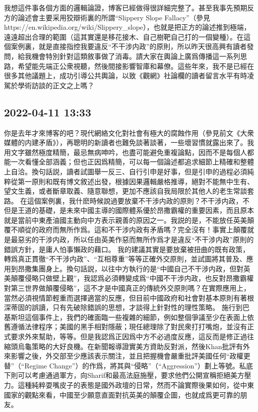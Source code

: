 \documentclass[twocolumn]{ctexart}
\begin{document}
我想這件事各個方面的邏輯論證，博客已經做得很詳細完整了。甚至我事先預期反方的論述會主要采用狡辯術裏的所謂“Slippery Slope Fallacy”（參見https://en.wikipedia.org/wiki/Slippery\_slope），也就是把正方的論述推到極端，遠遠超出合理的範圍（這其實還是移花接木、自己樹靶自己打的一個變種）。在這個案例裏，就是直接指控我要違反“不干涉内政”的原則，所以昨天很高興有讀者發問，給我機會特別針對這類敘事做了消毒。請大家在輿論上廣爲傳播這一系列思路，希望能先端正公衆視聽，然後間接影響智庫和幕僚。這些年來，我不是已經在很多其他議題上，成功引導公共輿論，以致《觀網》社論欄的讀者留言水平有時凌駕於學術訪談的正文之上嗎？
\subsection*{2022-04-11 13:33}

你是去年才來博客的吧？現代網絡文化對社會有極大的腐蝕作用（參見前文《大衆媒體的内建矛盾》），再聰明的新讀者也難免談著談著，一些壞習慣就露出來了。我用文字雖然極度精簡，最忌無病呻吟，也盡可能避免重複論點，因而不是每個人都能一次看懂全部涵義；但也正因爲精簡，可以每一個論述都追求細節上精確和整體上自洽。換句話説，讀者試圖舉一反三、自行引申是好事，但是引申的過程必須純粹從第一原則和既有博文敘述出發，根據因果邏輯嚴格推導，絕對不能無中生有、望文生義，或者斷章取義、隨意聯想，更加不應該自我局限於其他人的老生常談套路。
在這個案例裏，我什麽時候說過要放棄不干涉内政的原則？不干涉内政，不但是王道的基礎，是未來中國主導的國際體系優於昂撒霸權的重要因素，而且原本就是當前中東產油國主動向中方表示親善的原因之一。我説的是，不能放任英美顛覆不順從的政府而無所作爲。這和不干涉内政有矛盾嗎？完全沒有！事實上顛覆就是最惡劣的干涉内政，所以任由英美作惡而無所作爲才是違反“不干涉内政”原則的錯誤方針，是庸人怕事懶政的藉口。
我的建議其實是要放棄被扭曲的既有政策，轉爲真正貫徹“不干涉内政”、“互相尊重”等等正確外交原則，並試圖將其普及、應用到昂撒集團身上。換句話説，以往中方執行的是“中國自己不干涉内政，但對英美顛覆侵略只做壁上觀”，我認爲必須轉變成爲“中國不干涉内政，也反對昂撒霸權對第三世界做顛覆侵略”，這不才是中國真正的傳統外交原則嗎？在實際應用上，當然必須視情節輕重而選擇適當的反應，但目前中國政府和社會對基本原則有著根深蒂固的誤讀，只有先破除錯誤的思想，才談得上針對性的理性策略。
施行到巴基斯坦這個事件上，我們的確面臨一些複雜的細節，例如整個爭議至少在表面上依舊遵循法律程序；美國的黑手相對隱蔽；現任總理除了對民衆打打嘴炮，並沒有正式要求外來幫助，等等。但是我認爲正因爲中方不必過度反應，這反而是修正過往縮頭烏龜策略的大好良機。在新聞報導證實美方資助反對派，然後Khan批評有外來影響之後，外交部至少應該表示關注，並且把握機會嚴重批評美國任何“政權更替”（“Regime Change”）的作爲，將其與“侵略”（“Aggression”）劃上等號。私底下則可以考慮通過軍方，向Sharif和最高法庭施壓，要求他們公開宣稱拒絕美方壓力。這種純粹耍嘴皮子的表態是國外政壇的日常，然而不論實際後果如何，從中東國家的觀點來看，中國至少願意直面對抗英美的顛覆企圖，也就成爲更可靠的朋友。
\end{document}
